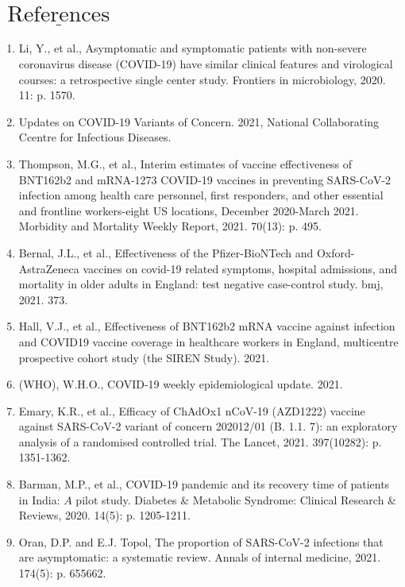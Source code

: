 \documentclass[10pt]{article}
\begin{document}
\section{$\underline{\text { References }}$}
\begin{enumerate}
  \item Li, Y., et al., Asymptomatic and symptomatic patients with non-severe coronavirus disease (COVID-19) have similar clinical features and virological courses: a retrospective single center study. Frontiers in microbiology, 2020. 11: p. 1570.
​
  \item Updates on COVID-19 Variants of Concern. 2021, National Collaborating Ccentre for Infectious Diseases.
​
  \item Thompson, M.G., et al., Interim estimates of vaccine effectiveness of BNT162b2 and mRNA-1273 COVID-19 vaccines in preventing SARS-CoV-2 infection among health care personnel, first responders, and other essential and frontline workers-eight US locations, December 2020-March 2021. Morbidity and Mortality Weekly Report, 2021. 70(13): p. 495.
​
  \item Bernal, J.L., et al., Effectiveness of the Pfizer-BioNTech and Oxford-AstraZeneca vaccines on covid-19 related symptoms, hospital admissions, and mortality in older adults in England: test negative case-control study. bmj, 2021. 373.
​
  \item Hall, V.J., et al., Effectiveness of BNT162b2 mRNA vaccine against infection and COVID19 vaccine coverage in healthcare workers in England, multicentre prospective cohort study (the SIREN Study). 2021.
​
  \item (WHO), W.H.O., COVID-19 weekly epidemiological update. 2021.
​
  \item Emary, K.R., et al., Efficacy of ChAdOx1 nCoV-19 (AZD1222) vaccine against SARS-CoV-2 variant of concern 202012/01 (B. 1.1. 7): an exploratory analysis of a randomised controlled trial. The Lancet, 2021. 397(10282): p. 1351-1362.
​
  \item Barman, M.P., et al., COVID-19 pandemic and its recovery time of patients in India: $A$ pilot study. Diabetes \& Metabolic Syndrome: Clinical Research \& Reviews, 2020. 14(5): p. 1205-1211.
​
  \item Oran, D.P. and E.J. Topol, The proportion of SARS-CoV-2 infections that are asymptomatic: a systematic review. Annals of internal medicine, 2021. 174(5): p. 655662.
​
\end{enumerate}
​
\end{document}
